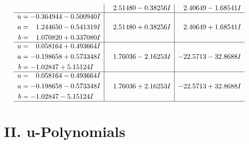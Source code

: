 \documentclass[1p]{elsarticle_modified}
\theoremstyle{definition}
\begin{document}
$$\begin{array}{c|c|c}
 & \phantom{-}2.51480 - 0.38256 I & \phantom{-}2.40649 - 1.68541 I \\ \hline\begin{aligned}
u &= -0.364944 - 0.500940 I \\
a &= \phantom{-}1.244650 - 0.541319 I \\
b &= \phantom{-}1.070820 + 0.337080 I\end{aligned}
 & \phantom{-}2.51480 + 0.38256 I & \phantom{-}2.40649 + 1.68541 I \\ \hline\begin{aligned}
u &= \phantom{-}0.058164 + 0.493664 I \\
a &= -0.198658 + 0.573348 I \\
b &= -1.02847 + 5.15124 I\end{aligned}
 & \phantom{-}1.76036 - 2.16253 I & -22.5713 - 32.8688 I \\ \hline\begin{aligned}
u &= \phantom{-}0.058164 - 0.493664 I \\
a &= -0.198658 - 0.573348 I \\
b &= -1.02847 - 5.15124 I\end{aligned}
 & \phantom{-}1.76036 + 2.16253 I & -22.5713 + 32.8688 I\\
 \hline 
 \end{array}$$\newpage
\newpage\renewcommand{\arraystretch}{1}
\centering \section*{ II. u-Polynomials}
\end{document}
